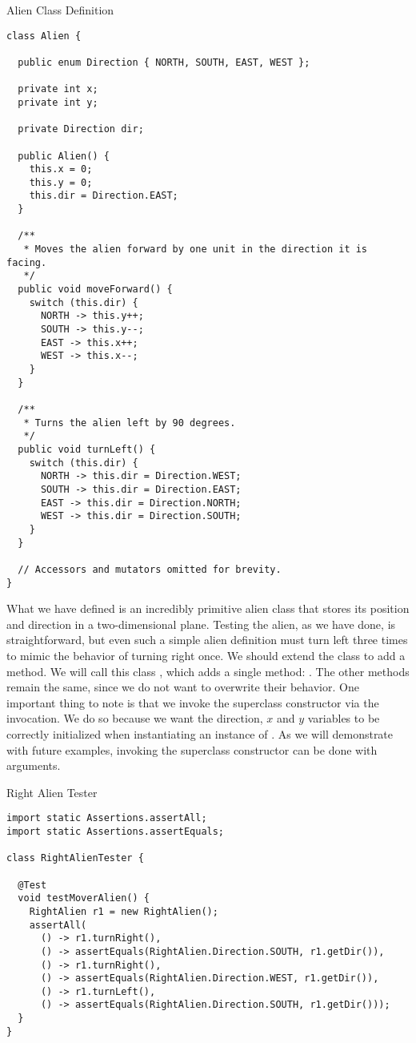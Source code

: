 \begin{cl}{Alien Class Definition}
\begin{lstlisting}[language=MyJava]
class Alien {

  public enum Direction { NORTH, SOUTH, EAST, WEST };

  private int x;
  private int y;

  private Direction dir;

  public Alien() {
    this.x = 0;
    this.y = 0;
    this.dir = Direction.EAST;
  }

  /**
   * Moves the alien forward by one unit in the direction it is facing.
   */
  public void moveForward() {
    switch (this.dir) {
      NORTH -> this.y++;
      SOUTH -> this.y--;
      EAST -> this.x++;
      WEST -> this.x--;
    }
  }

  /**
   * Turns the alien left by 90 degrees.
   */
  public void turnLeft() {
    switch (this.dir) {
      NORTH -> this.dir = Direction.WEST;
      SOUTH -> this.dir = Direction.EAST;
      EAST -> this.dir = Direction.NORTH;
      WEST -> this.dir = Direction.SOUTH;
    }
  }

  // Accessors and mutators omitted for brevity.
}
\end{lstlisting}
\end{cl}

What we have defined is an incredibly primitive alien class that stores its position and direction in a two-dimensional plane. Testing the alien, as we have done, is straightforward, but even such a simple alien definition must turn left three times to mimic the behavior of turning right once. We should extend the  class to add a  method. We will call this class , which adds a single method: . The other methods remain the same, since we do not want to overwrite their behavior. One important thing to note is that we invoke the superclass constructor via the  invocation. We do so because we want the direction, $x$ and $y$ variables to be correctly initialized when instantiating an instance of . As we will demonstrate with future examples, invoking the superclass constructor can be done with arguments.

\begin{cl}{Right Alien Tester}
\begin{lstlisting}[language=MyJava]
import static Assertions.assertAll;
import static Assertions.assertEquals;

class RightAlienTester {

  @Test
  void testMoverAlien() {
    RightAlien r1 = new RightAlien();
    assertAll(
      () -> r1.turnRight(),
      () -> assertEquals(RightAlien.Direction.SOUTH, r1.getDir()),
      () -> r1.turnRight(),
      () -> assertEquals(RightAlien.Direction.WEST, r1.getDir()),
      () -> r1.turnLeft(),
      () -> assertEquals(RightAlien.Direction.SOUTH, r1.getDir()));
  }
}
\end{lstlisting}
\end{cl}

